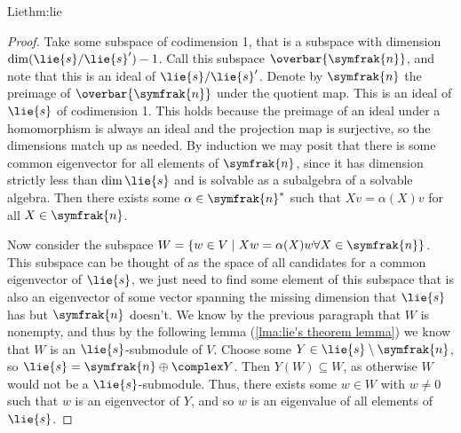 \documentclass[fleqn]{NotesClass}
\newcommand{\nilpotentLie}{\symfrak{n}}
\begin{document}
\begin{thm}{Lie}{thm:lie}
\begin{proof}
            Take some subspace of codimension 1, that is a subspace with dimension \(\dim(\lie{s}/\lie{s}') - 1\).
            Call this subspace \(\overbar{\nilpotentLie}\), and note that this is an ideal of \(\lie{s}/\lie{s}'\).
            Denote by \(\nilpotentLie\) the preimage of \(\overbar{\nilpotentLie}\) under the quotient map.
            This is an ideal of \(\lie{s}\) of codimension 1.
            This holds because the preimage of an ideal under a homomorphism is always an ideal and the projection map is surjective, so the dimensions match up as needed.
            By induction we may posit that there is some common eigenvector for all elements of \(\nilpotentLie\), since it has dimension strictly less than \(\dim\lie{s}\) and is solvable as a subalgebra of a solvable algebra.
            Then there exists some \(\alpha \in \nilpotentLie^*\) such that \(Xv = \alpha(X)v\) for all \(X \in \nilpotentLie\).
            
            Now consider the subspace \(W = \{w \in V \mid Xw = \alpha(X)w \forall X \in \nilpotentLie\}\).
            This subspace can be thought of as the space of all candidates for a common eigenvector of \(\lie{s}\), we just need to find some element of this subspace that is also an eigenvector of some vector spanning the missing dimension that \(\lie{s}\) has but \(\nilpotentLie\) doesn't.
            We know by the previous paragraph that \(W\) is nonempty, and thus by the following lemma (\cref{lma:lie's theorem lemma}) we know that \(W\) is an \(\lie{s}\)-submodule of \(V\).
            Choose some \(Y \in \lie{s} \setminus \nilpotentLie\), so \(\lie{s} = \nilpotentLie \oplus \complex Y\).
            Then \(Y(W) \subseteq W\), as otherwise \(W\) would not be a \(\lie{s}\)-submodule.
            Thus, there exists some \(w \in W\) with \(w \ne 0\) such that \(w\) is an eigenvector of \(Y\), and so \(w\) is an eigenvalue of all elements of \(\lie{s}\).
        \end{proof}
    \end{thm}
    
\end{document}
